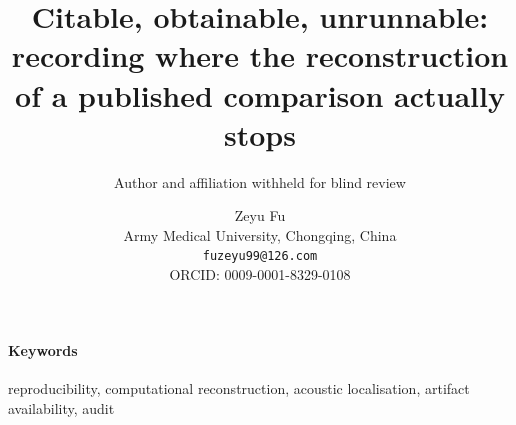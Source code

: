 \documentclass[11pt]{article}
\title{Citable, obtainable, unrunnable: recording where the reconstruction of a
published comparison actually stops}
\author{Author and affiliation withheld for blind review}
\author{Zeyu Fu\\
Army Medical University, Chongqing, China\\
\texttt{fuzeyu99@126.com}\\
ORCID: 0009-0001-8329-0108}
\date{}
\numberwithin{equation}{section}
\begin{document}
\maketitle

\begin{abstract}

\end{abstract}

\paragraph{Keywords} reproducibility, computational reconstruction, acoustic localisation, artifact availability, audit



{\footnotesize


}
\end{document}
